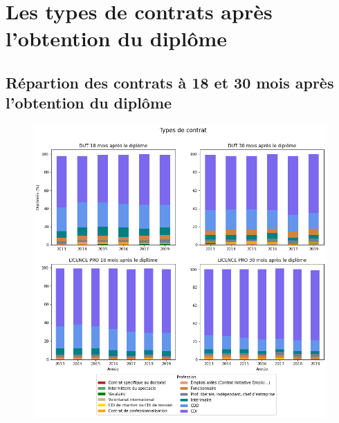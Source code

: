 \documentclass[12pt, a4paper, titlepage, table]{article}
\begin{document}
\section{Les types de contrats après l'obtention du diplôme}

	\subsection{Répartion des contrats à 18 et 30 mois après l'obtention du diplôme}
		\begin{figure}[H]
			\centering
			\includegraphics[width=1\textwidth]{../graphs/repartition_contrats_situation_1.png}
			\label{fig:contrat_pourcentage_1}
		\end{figure}
	
\end{document}
